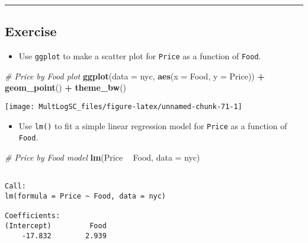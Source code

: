 \documentclass[
]{book}
\newenvironment{Shaded}{\begin{snugshade}}{\end{snugshade}}
\newcommand{\CommentTok}[1]{\textcolor[rgb]{0.56,0.35,0.01}{\textit{#1}}}
\newcommand{\DataTypeTok}[1]{\textcolor[rgb]{0.13,0.29,0.53}{#1}}
\newcommand{\KeywordTok}[1]{\textcolor[rgb]{0.13,0.29,0.53}{\textbf{#1}}}
\newcommand{\NormalTok}[1]{#1}
\newcommand{\OperatorTok}[1]{\textcolor[rgb]{0.81,0.36,0.00}{\textbf{#1}}}
\newcommand{\StringTok}[1]{\textcolor[rgb]{0.31,0.60,0.02}{#1}}
\providecommand{\tightlist}{%
  \setlength{\itemsep}{0pt}\setlength{\parskip}{0pt}}
\begin{document}
\begin{center}\rule{0.5\linewidth}{0.5pt}\end{center}

\hypertarget{exercise-21}{%
\subsection*{Exercise}\label{exercise-21}}

\begin{itemize}
\tightlist
\item
  Use \texttt{ggplot} to make a scatter plot for \texttt{Price} as a function of \texttt{Food}.
\end{itemize}

\begin{Shaded}
\begin{Highlighting}[]
\CommentTok{# Price by Food plot}
\KeywordTok{ggplot}\NormalTok{(}\DataTypeTok{data =}\NormalTok{ nyc, }\KeywordTok{aes}\NormalTok{(}\DataTypeTok{x =}\NormalTok{ Food, }\DataTypeTok{y =}\NormalTok{ Price)) }\OperatorTok{+}\StringTok{ }
\StringTok{  }\KeywordTok{geom_point}\NormalTok{() }\OperatorTok{+}\StringTok{ }
\StringTok{  }\KeywordTok{theme_bw}\NormalTok{()}
\end{Highlighting}
\end{Shaded}

\begin{center}\texttt{[image: MultLogSC\_files/figure-latex/unnamed-chunk-71-1]} \end{center}

\begin{itemize}
\tightlist
\item
  Use \texttt{lm()} to fit a simple linear regression model for \texttt{Price} as a function of \texttt{Food}.
\end{itemize}

\begin{Shaded}
\begin{Highlighting}[]
\CommentTok{# Price by Food model}
\KeywordTok{lm}\NormalTok{(Price }\OperatorTok{~}\StringTok{ }\NormalTok{Food, }\DataTypeTok{data =}\NormalTok{ nyc)}
\end{Highlighting}
\end{Shaded}

\begin{verbatim}

Call:
lm(formula = Price ~ Food, data = nyc)

Coefficients:
(Intercept)         Food  
    -17.832        2.939  
\end{verbatim}
\end{document}
